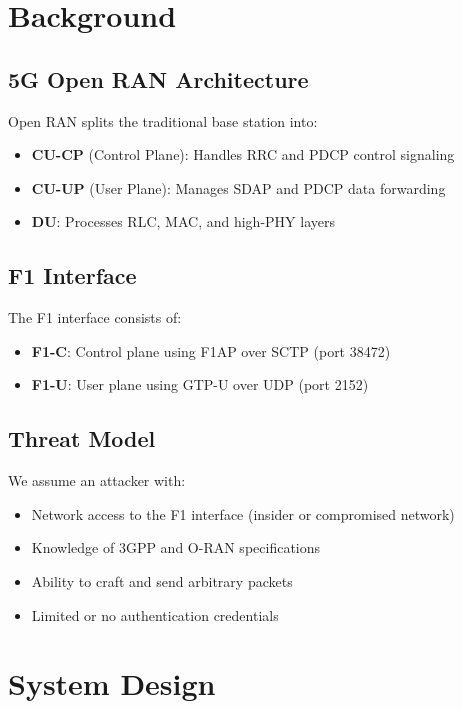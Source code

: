 \documentclass[conference]{IEEEtran}
\begin{document}
\section{Background}

\subsection{5G Open RAN Architecture}

Open RAN splits the traditional base station into:
\begin{itemize}
    \item \textbf{CU-CP} (Control Plane): Handles RRC and PDCP control signaling
    \item \textbf{CU-UP} (User Plane): Manages SDAP and PDCP data forwarding
    \item \textbf{DU}: Processes RLC, MAC, and high-PHY layers
\end{itemize}

\subsection{F1 Interface}

The F1 interface \cite{3gpp-38.473} consists of:
\begin{itemize}
    \item \textbf{F1-C}: Control plane using F1AP over SCTP (port 38472)
    \item \textbf{F1-U}: User plane using GTP-U over UDP (port 2152)
\end{itemize}

\subsection{Threat Model}

We assume an attacker with:
\begin{itemize}
    \item Network access to the F1 interface (insider or compromised network)
    \item Knowledge of 3GPP and O-RAN specifications
    \item Ability to craft and send arbitrary packets
    \item Limited or no authentication credentials
\end{itemize}

\section{System Design}
\end{document}

